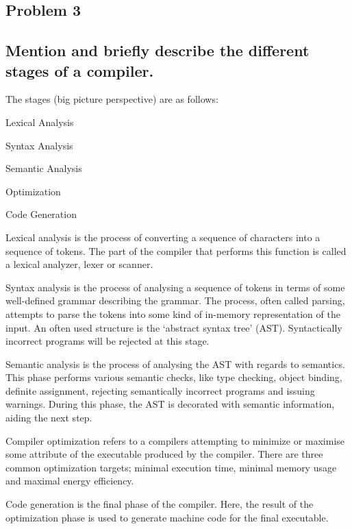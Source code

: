 \documentclass[twoside]{article}
\begin{document}
\begin{multicols}{2}

\section{Problem 3}

\subsection*{Mention and briefly describe the different stages of a compiler.}

The stages (big picture perspective) are as follows:

\begin{compactitem}
\item Lexical Analysis
\item Syntax Analysis
\item Semantic Analysis
\item Optimization
\item Code Generation
\end{compactitem}


Lexical analysis is the process of converting a sequence of characters into a sequence of tokens.
The part of the compiler that performs this function is called a lexical analyzer, lexer or scanner.

Syntax analysis is the process of analysing a sequence of tokens in terms of some well-defined grammar describing the grammar.
The process, often called parsing, attempts to parse the tokens into some kind of in-memory representation of the input.
An often used structure is the `abstract syntax tree' (AST). Syntactically incorrect programs will be rejected at this stage.

Semantic analysis is the process of analysing the AST with regards to semantics.
This phase performs various semantic checks, like type checking, object binding, definite assignment, rejecting semantically incorrect programs and issuing warnings. During this phase, the AST is decorated with semantic information, aiding the next step.

Compiler optimization refers to a compilers attempting to minimize or maximise some attribute of the executable produced by the compiler. There are three common optimization targets; minimal execution time, minimal memory usage and maximal energy efficiency.

Code generation is the final phase of the compiler. Here, the result of the optimization phase is used to generate machine code for the final executable.


\end{multicols}
\end{document}

